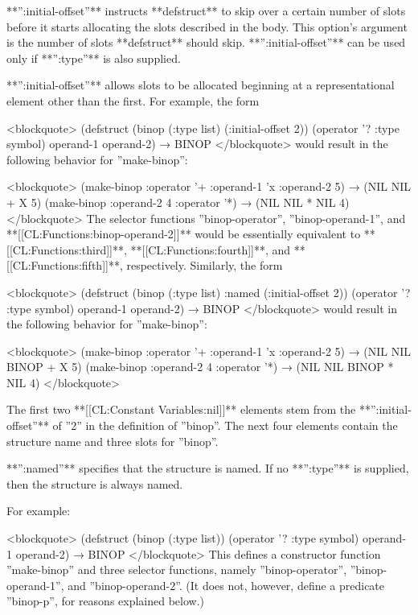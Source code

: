 
**'':initial-offset''** instructs **defstruct** to skip over a certain number of slots before it starts allocating the slots described in the body. This option's argument is the number of slots **defstruct** should skip. **'':initial-offset''** can be used only if **'':type''** is also supplied.


**'':initial-offset''** allows slots to be allocated beginning at a representational element other than the first. For example, the form

<blockquote> (defstruct (binop (:type list) (:initial-offset 2)) (operator '? :type symbol) operand-1 operand-2) → BINOP </blockquote> would result in the following behavior for ''make-binop'':

<blockquote> (make-binop :operator '+ :operand-1 'x :operand-2 5) → (NIL NIL + X 5) (make-binop :operand-2 4 :operator '*) → (NIL NIL * NIL 4) </blockquote> The selector functions ''binop-operator'', ''binop-operand-1'', and **[[CL:Functions:binop-operand-2]]** would be essentially equivalent to **[[CL:Functions:third]]**, **[[CL:Functions:fourth]]**, and **[[CL:Functions:fifth]]**, respectively. Similarly, the form

<blockquote> (defstruct (binop (:type list) :named (:initial-offset 2)) (operator '? :type symbol) operand-1 operand-2) → BINOP </blockquote> would result in the following behavior for ''make-binop'':

<blockquote> (make-binop :operator '+ :operand-1 'x :operand-2 5) → (NIL NIL BINOP + X 5) (make-binop :operand-2 4 :operator '*) → (NIL NIL BINOP * NIL 4) </blockquote>

The first two **[[CL:Constant Variables:nil]]** elements stem from the **'':initial-offset''** of ''2'' in the definition of ''binop''. The next four elements contain the structure name and three slots for ''binop''.


**'':named''** specifies that the structure is named. If no **'':type''** is supplied, then the structure is always named.

For example:

<blockquote> (defstruct (binop (:type list)) (operator '? :type symbol) operand-1 operand-2) → BINOP </blockquote> This defines a constructor function ''make-binop'' and three selector functions, namely ''binop-operator'', ''binop-operand-1'', and ''binop-operand-2''. (It does not, however, define a predicate ''binop-p'', for reasons explained below.)

